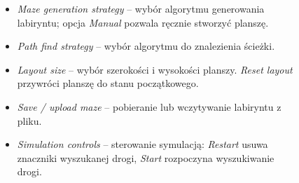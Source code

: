 \documentclass[../doc.tex]{subfiles}
\begin{document}
\begin{figure}[H]
\begin{minipage}[c]{0.6\textwidth}
\begin{itemize}
                \item \textit{Maze generation strategy} – wybór algorytmu generowania labiryntu; opcja \textit{Manual} pozwala ręcznie stworzyć planszę.
                
                \item \textit{Path find strategy} – wybór algorytmu do znalezienia ścieżki.
                
                \item \textit{Layout size} – wybór szerokości i wysokości planszy. \textit{Reset layout} przywróci planszę do stanu początkowego.
                
                \item \textit{Save / upload maze} – pobieranie lub wczytywanie labiryntu z pliku.
                
                \item \textit{Simulation controls} – sterowanie symulacją: \textit{Restart} usuwa znaczniki wyszukanej drogi, \textit{Start} rozpoczyna wyszukiwanie drogi.
            \end{itemize}
        \end{minipage}
    \end{figure}
\end{document}
